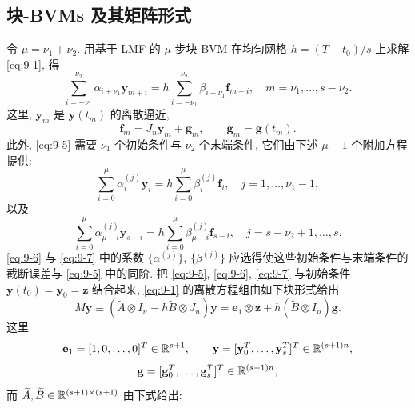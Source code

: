 \subsection{块-BVMs 及其矩阵形式}
\label{sec:9-2-2}

令 $\mu=\nu_1+\nu_2$. 用基于 LMF 的 $\mu$ 步块-BVM 在均匀网格 $h=(T-t_0)/s$ 上求解 \eqref{eq:9-1}, 得
\begin{equation}
  \sum_{i=-\nu_1}^{\nu_2}\alpha_{i+\nu_1}\mathbf{y}_{m+i}
  =h\sum_{i=-\nu_1}^{\nu_2}\beta_{i+\nu_1}\mathbf{f}_{m+i},
  \quad m=\nu_1,\ldots,s-\nu_2.
  \label{eq:9-5}
\end{equation}
这里, $\mathbf{y}_m$ 是 $\mathbf{y}(t_m)$ 的离散逼近,
\[
  \mathbf{f}_m=J_n\mathbf{y}_m+\mathbf{g}_m,\qquad
  \mathbf{g}_m=\mathbf{g}(t_m).
\]
此外, \eqref{eq:9-5} 需要 $\nu_1$ 个初始条件与 $\nu_2$ 个末端条件, 它们由下述 $\mu-1$ 个附加方程提供:
\begin{equation}
  \sum_{i=0}^{\mu}\alpha_i^{(j)}\mathbf{y}_i
  =h\sum_{i=0}^{\mu}\beta_i^{(j)}\mathbf{f}_i,
  \quad j=1,\ldots,\nu_1-1,
  \label{eq:9-6}
\end{equation}
以及
\begin{equation}
  \sum_{i=0}^{\mu}\alpha_{\mu-i}^{(j)}\mathbf{y}_{s-i}
  =h\sum_{i=0}^{\mu}\beta_{\mu-i}^{(j)}\mathbf{f}_{s-i},
  \quad j=s-\nu_2+1,\ldots,s.
  \label{eq:9-7}
\end{equation}
\eqref{eq:9-6} 与 \eqref{eq:9-7} 中的系数 $\{\alpha^{(j)}\}$, $\{\beta^{(j)}\}$ 应选得使这些初始条件与末端条件的截断误差与 \eqref{eq:9-5} 中的同阶. 把 \eqref{eq:9-5}, \eqref{eq:9-6}, \eqref{eq:9-7} 与初始条件 $\mathbf{y}(t_0)=\mathbf{y}_0=\mathbf{z}$ 结合起来, \eqref{eq:9-1} 的离散方程组由如下块形式给出
\begin{equation}
  M\mathbf{y}\equiv(\widetilde{A}\otimes I_n-h\widetilde{B}\otimes J_n)\mathbf{y}
  =\mathbf{e}_1\otimes\mathbf{z}+h(\widetilde{B}\otimes I_n)\mathbf{g}.
  \label{eq:9-8}
\end{equation}
这里
\[
  \mathbf{e}_1=[1,0,\ldots,0]^T\in\mathbb{R}^{s+1},\qquad
  \mathbf{y}=[\mathbf{y}_0^T,\ldots,\mathbf{y}_s^T]^T\in\mathbb{R}^{(s+1)n},
\]
\[
  \mathbf{g}=[\mathbf{g}_0^T,\ldots,\mathbf{g}_s^T]^T\in\mathbb{R}^{(s+1)n},
\]
而 $\widetilde{A},\widetilde{B}\in\mathbb{R}^{(s+1)\times(s+1)}$ 由下式给出:

